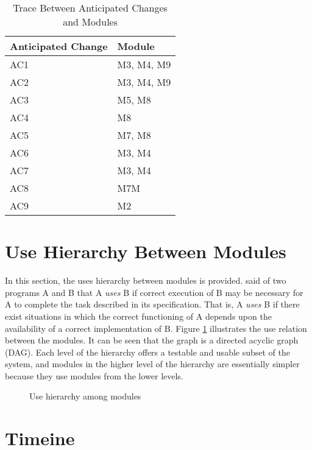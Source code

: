 \documentclass[12pt, titlepage]{article}
\begin{document}
\begin{table}[H]
  \centering
  \begin{tabular}{p{} p{}}
  \toprule
  \textbf{Anticipated Change} & \textbf{Module}\\
  \midrule
  AC1 & M3, M4, M9\\
  AC2 & M3, M4, M9\\
  AC3 & M5, M8\\
  AC4 & M8\\
  AC5 & M7, M8\\
  AC6 & M3, M4\\
  AC7 & M3, M4\\
  AC8 & M7M\\
  AC9 & M2\\
  \bottomrule
  \end{tabular}
  \caption{Trace Between Anticipated Changes and Modules}
  \label{TblACM}
  \end{table}

\section{Use Hierarchy Between Modules} \label{SecUse}

In this section, the uses hierarchy between modules is
provided. \citet{Parnas1978} said of two programs A and B that A {\em uses} B if
correct execution of B may be necessary for A to complete the task described in
its specification. That is, A {\em uses} B if there exist situations in which
the correct functioning of A depends upon the availability of a correct
implementation of B.  Figure \ref{FigUH} illustrates the use relation between
the modules. It can be seen that the graph is a directed acyclic graph
(DAG). Each level of the hierarchy offers a testable and usable subset of the
system, and modules in the higher level of the hierarchy are essentially simpler
because they use modules from the lower levels.

\begin{figure}[H]
\centering
\caption{Use hierarchy among modules}
\label{FigUH}
\end{figure}

\section{Timeine}
\end{document}
